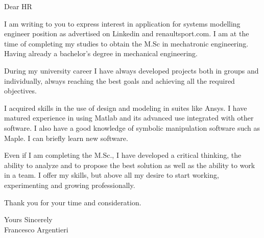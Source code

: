 \documentclass[a4paper,english]{friggeri-letter}
\begin{document}

\address{
   Circonvallazione Istoniense, 20 \\
   Vasto (CH), 66054 \\
   Italy
}




\opening{Dear HR}

I am writing to you to express interest in application for systems modelling engineer 
position as advertised on Linkedin and renaultsport.com. I am at the
time of completing my studies to obtain the M.Sc in mechatronic engineering.
Having already a bachelor's degree in mechanical engineering.

During my university career I have always developed projects both in groups and
individually, always reaching the best goals and achieving all the required
objectives.

I acquired skills in the use of design and modeling in suites like Ansys. I have
matured experience in using Matlab and its advanced use integrated with other
software. I also have a good knowledge of symbolic manipulation software such as
Maple. I can briefly learn new software.

Even if I am completing the M.Sc., I have developed a critical thinking, the
ability to analyze and to propose the best solution as well as the ability to
work in a team. I offer my skills, but above all my desire to start working,
experimenting and growing professionally.

Thank you for your time and consideration.

\closing{
   Yours Sincerely\\
   Francesco Argentieri}
\end{document}
